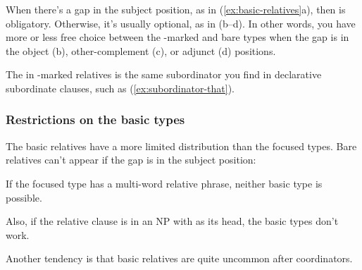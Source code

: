 When there's a gap in the subject position, as in (\ref{ex:basic-relatives}a), then  is obligatory. Otherwise, it's usually optional, as in (b--d). In other words, you have more or less free choice between the -marked and bare types when the gap is in the object (b), other-complement (c), or adjunct (d) positions.

The  in -marked relatives is the same subordinator you find in declarative subordinate clauses, such as (\ref{ex:subordinator-that}).

\ea \label{ex:subordinator-that}
    \z
\z

\subsubsection*{Restrictions on the basic types}

The basic relatives have a more limited distribution than the focused types. Bare relatives can't appear if the gap is in the subject position:

\ea
    \z
\z
If the focused type has a multi-word relative phrase, neither basic type is possible.

\Needspace{22pt}
\ea
    \z
\z
\ea
    \z
\z
Also, if the relative clause is in an NP with  as its head, the basic types don't work.

\ea
    \z
\z
Another tendency is that basic relatives are quite uncommon after coordinators.

